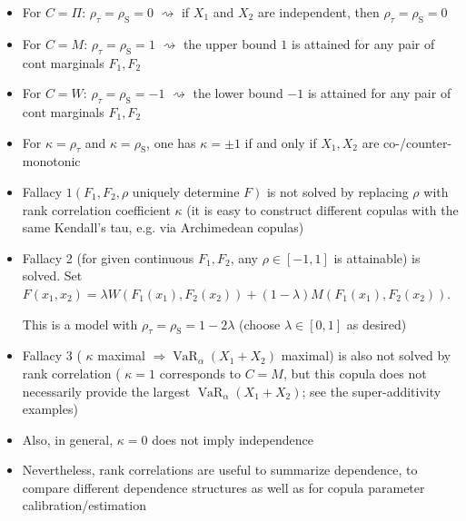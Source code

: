 \begin{itemize}[leftmargin=*]
    \item For $C=\Pi$: $\rho_{\tau}=\rho_{\mathrm{S}}=0$
$\rightsquigarrow$ if $X_{1}$ and $X_{2}$ are independent, then $\rho_{\tau}=\rho_{\mathrm{S}}=0$

    \item For $C=M$:
$
\rho_{\tau}=\rho_{\mathrm{S}}=1
$
$\rightsquigarrow$ the upper bound $1$ is attained for any pair of cont marginals $F_{1}, F_{2}$

    \item For $C=W$:
$
\rho_{\tau}=\rho_{\mathrm{S}}=-1
$
$\rightsquigarrow$ the lower bound $-1$ is attained for any pair of cont marginals $F_{1}, F_{2}$

    \item For $\kappa=\rho_{\tau}$ and $\kappa=\rho_{\mathrm{S}}$, one has $\kappa=\pm 1$ if and only if $X_{1}, X_{2}$ are co-/counter-monotonic
    \item Fallacy $1\left(F_{1}, F_{2}, \rho\right.$ uniquely determine $\left.F\right)$ is not solved by replacing $\rho$ with rank correlation coefficient $\kappa$ (it is easy to construct different copulas with the same Kendall's tau, e.g. via Archimedean copulas)
    \item Fallacy 2 (for given continuous $F_{1}, F_{2}$, any $\rho \in[-1,1]$ is attainable) is solved. Set
$
F\left(x_{1}, x_{2}\right)=\lambda W\left(F_{1}\left(x_{1}\right), F_{2}\left(x_{2}\right)\right)+(1-\lambda) M\left(F_{1}\left(x_{1}\right), F_{2}\left(x_{2}\right)\right)
$.

This is a model with $\rho_{\tau}=\rho_{\mathrm{S}}=1-2 \lambda$ (choose $\lambda \in[0,1]$ as desired)
    \item Fallacy 3 ( $\kappa$ maximal $\Rightarrow \operatorname{VaR}_{\alpha}\left(X_{1}+X_{2}\right)$ maximal) is also not solved by rank correlation ( $\kappa=1$ corresponds to $C=M$, but this copula does not necessarily provide the largest $\operatorname{VaR}_{\alpha}\left(X_{1}+X_{2}\right)$; see the super-additivity examples)
    \item Also, in general, $\kappa=0$ does not imply independence
    \item Nevertheless, rank correlations are useful to summarize dependence, to compare different dependence structures as well as for copula parameter calibration/estimation

\end{itemize}









